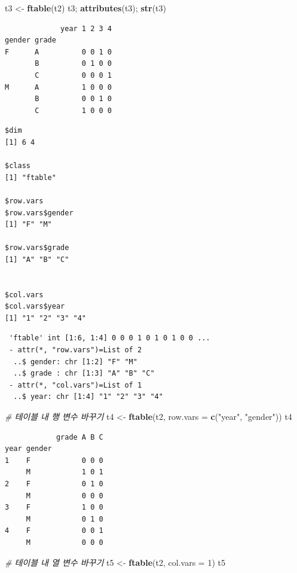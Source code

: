 \documentclass[
  11pt,
]{krantz}
\newenvironment{Shaded}{\begin{snugshade}}{\end{snugshade}}
\newcommand{\CommentTok}[1]{\textcolor[rgb]{0.37,0.37,0.37}{\textit{#1}}}
\newcommand{\DataTypeTok}[1]{\textcolor[rgb]{0.27,0.27,0.27}{#1}}
\newcommand{\DecValTok}[1]{\textcolor[rgb]{0.06,0.06,0.06}{#1}}
\newcommand{\KeywordTok}[1]{\textcolor[rgb]{0.27,0.27,0.27}{\textbf{#1}}}
\newcommand{\NormalTok}[1]{#1}
\newcommand{\StringTok}[1]{\textcolor[rgb]{0.5,0.5,0.5}{#1}}
\begin{document}
\footnotesize

\begin{Shaded}
\begin{Highlighting}[]
\NormalTok{t3 <-}\StringTok{ }\KeywordTok{ftable}\NormalTok{(t2)}
\NormalTok{t3; }\KeywordTok{attributes}\NormalTok{(t3); }\KeywordTok{str}\NormalTok{(t3)}
\end{Highlighting}
\end{Shaded}

\begin{verbatim}
             year 1 2 3 4
gender grade             
F      A          0 0 1 0
       B          0 1 0 0
       C          0 0 0 1
M      A          1 0 0 0
       B          0 0 1 0
       C          1 0 0 0
\end{verbatim}

\begin{verbatim}
$dim
[1] 6 4

$class
[1] "ftable"

$row.vars
$row.vars$gender
[1] "F" "M"

$row.vars$grade
[1] "A" "B" "C"


$col.vars
$col.vars$year
[1] "1" "2" "3" "4"
\end{verbatim}

\begin{verbatim}
 'ftable' int [1:6, 1:4] 0 0 0 1 0 1 0 1 0 0 ...
 - attr(*, "row.vars")=List of 2
  ..$ gender: chr [1:2] "F" "M"
  ..$ grade : chr [1:3] "A" "B" "C"
 - attr(*, "col.vars")=List of 1
  ..$ year: chr [1:4] "1" "2" "3" "4"
\end{verbatim}

\begin{Shaded}
\begin{Highlighting}[]
\CommentTok{# 테이블 내 행 변수 바꾸기}
\NormalTok{t4 <-}\StringTok{ }\KeywordTok{ftable}\NormalTok{(t2, }\DataTypeTok{row.vars =} \KeywordTok{c}\NormalTok{(}\StringTok{"year"}\NormalTok{, }\StringTok{"gender"}\NormalTok{))}
\NormalTok{t4}
\end{Highlighting}
\end{Shaded}

\begin{verbatim}
            grade A B C
year gender            
1    F            0 0 0
     M            1 0 1
2    F            0 1 0
     M            0 0 0
3    F            1 0 0
     M            0 1 0
4    F            0 0 1
     M            0 0 0
\end{verbatim}

\begin{Shaded}
\begin{Highlighting}[]
\CommentTok{# 테이블 내 열 변수 바꾸기}
\NormalTok{t5 <-}\StringTok{ }\KeywordTok{ftable}\NormalTok{(t2, }\DataTypeTok{col.vars =} \DecValTok{1}\NormalTok{)}
\NormalTok{t5}
\end{Highlighting}
\end{Shaded}
\end{document}

